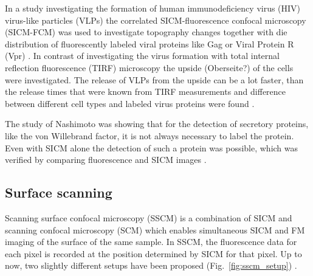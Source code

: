 In a study investigating the formation of human immunodeficiency virus (HIV) virus-like particles 
(VLPs) the correlated SICM-fluorescence confocal microscopy (SICM-FCM) was used to investigate 
topography changes together with die distribution of fluorescently labeled viral proteins like Gag 
or Viral Protein R (Vpr) \cite{Bednarska2020}. In contrast of investigating the virus formation 
with total internal reflection fluorescence (TIRF) microscopy \cite{Jouvenet2008} the upside 
(Oberseite?) of the cells were investigated. The release of VLPs from the upside can be a lot 
faster, than the release times that were known from TIRF measurements and difference between 
different cell types and labeled virus proteins were found \cite{Bednarska2020}. 

The study of Nashimoto was showing that for the detection of secretory proteins, like the von 
Willebrand factor, it is not always necessary to label the protein. Even with SICM alone the 
detection of such a protein was possible, which was verified by comparing fluorescence and SICM 
images \cite{Nashimoto2015}.



\subsection{Surface scanning}

Scanning surface confocal microscopy (SSCM) \cite{Gorelik2002} is a
combination of SICM and scanning confocal microscopy (SCM) which enables
simultaneous SICM and FM imaging of the surface of the same sample. In SSCM,
the fluorescence data for each pixel is recorded at the position determined by
SICM for that pixel. Up to now, two slightly different setups have been proposed
(Fig.~\ref{fig:sscm_setup}) \cite{Gorelik2002,Shevchuk2013}.

